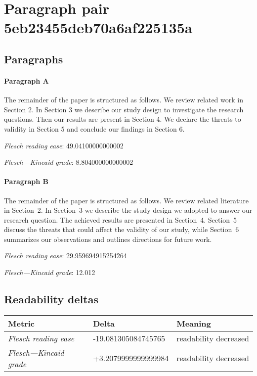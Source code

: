 \section{Paragraph pair 5eb23455deb70a6af225135a}
\subsection{Paragraphs}
\paragraph{Paragraph A}
The remainder of the paper is structured as follows. We review related work in Section 2. In Section 3 we describe our study design to investigate the research questions. Then our results are present in Section 4. We declare the threats to validity in Section 5 and conclude our findings in Section 6.\par\medskip\emph{Flesch reading ease}: 49.04100000000002\par\emph{Flesch---Kincaid grade}: 8.804000000000002

\paragraph{Paragraph B}
The remainder of the paper is structured as follows. We review related literature in Section 2. In Section 3 we describe the study design we adopted to answer our research question. The achieved results are presented in Section 4. Section 5 discuss the threats that could affect the validity of our study, while Section 6 summarizes our observations and outlines directions for future work.\par\medskip\emph{Flesch reading ease}: 29.959694915254264\par\emph{Flesch---Kincaid grade}: 12.012

\subsection{Readability deltas}

\begin{tabular}{lll}
\toprule
               \textbf{Metric} &       \textbf{Delta} &       \textbf{Meaning} \\
\midrule
    \emph{Flesch reading ease} &  -19.081305084745765 &  readability decreased \\
 \emph{Flesch---Kincaid grade} &  +3.2079999999999984 &  readability decreased \\
\bottomrule
\end{tabular}

